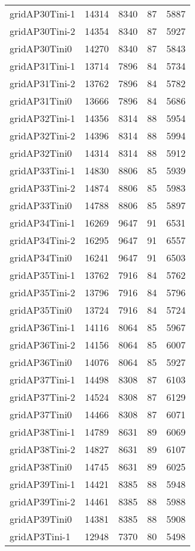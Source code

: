 \begin{longtable}{lrrrr}
gridAP30Tini-1 & 14314 & 8340 & 87 & 5887 \\
gridAP30Tini-2 & 14354 & 8340 & 87 & 5927 \\
gridAP30Tini0 & 14270 & 8340 & 87 & 5843 \\
gridAP31Tini-1 & 13714 & 7896 & 84 & 5734 \\
gridAP31Tini-2 & 13762 & 7896 & 84 & 5782 \\
gridAP31Tini0 & 13666 & 7896 & 84 & 5686 \\
gridAP32Tini-1 & 14356 & 8314 & 88 & 5954 \\
gridAP32Tini-2 & 14396 & 8314 & 88 & 5994 \\
gridAP32Tini0 & 14314 & 8314 & 88 & 5912 \\
gridAP33Tini-1 & 14830 & 8806 & 85 & 5939 \\
gridAP33Tini-2 & 14874 & 8806 & 85 & 5983 \\
gridAP33Tini0 & 14788 & 8806 & 85 & 5897 \\
gridAP34Tini-1 & 16269 & 9647 & 91 & 6531 \\
gridAP34Tini-2 & 16295 & 9647 & 91 & 6557 \\
gridAP34Tini0 & 16241 & 9647 & 91 & 6503 \\
gridAP35Tini-1 & 13762 & 7916 & 84 & 5762 \\
gridAP35Tini-2 & 13796 & 7916 & 84 & 5796 \\
gridAP35Tini0 & 13724 & 7916 & 84 & 5724 \\
gridAP36Tini-1 & 14116 & 8064 & 85 & 5967 \\
gridAP36Tini-2 & 14156 & 8064 & 85 & 6007 \\
gridAP36Tini0 & 14076 & 8064 & 85 & 5927 \\
gridAP37Tini-1 & 14498 & 8308 & 87 & 6103 \\
gridAP37Tini-2 & 14524 & 8308 & 87 & 6129 \\
gridAP37Tini0 & 14466 & 8308 & 87 & 6071 \\
gridAP38Tini-1 & 14789 & 8631 & 89 & 6069 \\
gridAP38Tini-2 & 14827 & 8631 & 89 & 6107 \\
gridAP38Tini0 & 14745 & 8631 & 89 & 6025 \\
gridAP39Tini-1 & 14421 & 8385 & 88 & 5948 \\
gridAP39Tini-2 & 14461 & 8385 & 88 & 5988 \\
gridAP39Tini0 & 14381 & 8385 & 88 & 5908 \\
gridAP3Tini-1 & 12948 & 7370 & 80 & 5498 \\

\end{longtable}
